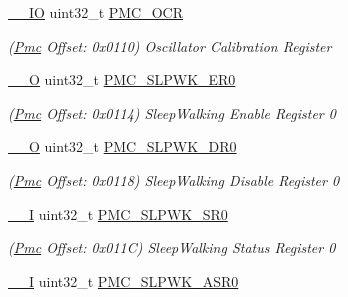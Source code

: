 \begin{DoxyCompactItemize}
\mbox{\hyperlink{core__cm7_8h_aec43007d9998a0a0e01faede4133d6be}{\+\_\+\+\_\+\+IO}} uint32\+\_\+t \mbox{\hyperlink{structPmc_ac4c245f5ef70e2c0cf019b0301df08eb}{P\+M\+C\+\_\+\+O\+CR}}
\begin{DoxyCompactList}\small\item\em (\mbox{\hyperlink{structPmc}{Pmc}} Offset\+: 0x0110) Oscillator Calibration Register \end{DoxyCompactList}\item 
\mbox{\label{structPmc_a4ac8c1fabd62fb0923bc46a456a8d8c0}} 
\mbox{\hyperlink{core__cm7_8h_a7e25d9380f9ef903923964322e71f2f6}{\+\_\+\+\_\+O}} uint32\+\_\+t \mbox{\hyperlink{structPmc_a4ac8c1fabd62fb0923bc46a456a8d8c0}{P\+M\+C\+\_\+\+S\+L\+P\+W\+K\+\_\+\+E\+R0}}
\begin{DoxyCompactList}\small\item\em (\mbox{\hyperlink{structPmc}{Pmc}} Offset\+: 0x0114) Sleep\+Walking Enable Register 0 \end{DoxyCompactList}\item 
\mbox{\label{structPmc_ac52405beceb8128c85485f76b3e61938}} 
\mbox{\hyperlink{core__cm7_8h_a7e25d9380f9ef903923964322e71f2f6}{\+\_\+\+\_\+O}} uint32\+\_\+t \mbox{\hyperlink{structPmc_ac52405beceb8128c85485f76b3e61938}{P\+M\+C\+\_\+\+S\+L\+P\+W\+K\+\_\+\+D\+R0}}
\begin{DoxyCompactList}\small\item\em (\mbox{\hyperlink{structPmc}{Pmc}} Offset\+: 0x0118) Sleep\+Walking Disable Register 0 \end{DoxyCompactList}\item 
\mbox{\label{structPmc_a3452bf5795e4eb6e850a45cf9a76f0fd}} 
\mbox{\hyperlink{core__cm7_8h_af63697ed9952cc71e1225efe205f6cd3}{\+\_\+\+\_\+I}} uint32\+\_\+t \mbox{\hyperlink{structPmc_a3452bf5795e4eb6e850a45cf9a76f0fd}{P\+M\+C\+\_\+\+S\+L\+P\+W\+K\+\_\+\+S\+R0}}
\begin{DoxyCompactList}\small\item\em (\mbox{\hyperlink{structPmc}{Pmc}} Offset\+: 0x011C) Sleep\+Walking Status Register 0 \end{DoxyCompactList}\item 
\mbox{\label{structPmc_ac739a9a7de4bdcb821addfd1a18a9a7c}} 
\mbox{\hyperlink{core__cm7_8h_af63697ed9952cc71e1225efe205f6cd3}{\+\_\+\+\_\+I}} uint32\+\_\+t \mbox{\hyperlink{structPmc_ac739a9a7de4bdcb821addfd1a18a9a7c}{P\+M\+C\+\_\+\+S\+L\+P\+W\+K\+\_\+\+A\+S\+R0}}

\end{DoxyCompactItemize}
